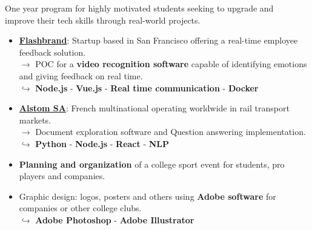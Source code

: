 \documentclass[9pt,a4paper,ragged2e]{altacv}
\begin{document}
One year program for highly motivated students seeking to upgrade and \\improve their tech skills through real-world projects.
\smallskip
\begin{itemize}
	\item \href{https://flashbrand.me/}{\textbf{Flashbrand}}: Startup based in San Francisco offering a real-time employee feedback solution. \\$\rightarrow$ POC for a \textbf{video recognition software} capable of identifying emotions and giving feedback on real time. \\
    $\hookrightarrow$ \textbf{Node.js} - \textbf{Vue.js} - \textbf{Real time communication} - \textbf{Docker}
  \item \href{https://www.alstom.com/}{\textbf{Alstom SA}}: French multinational operating worldwide in rail transport \\markets.\\
  $\rightarrow$ Document exploration software and Question answering implementation.\\
  $\hookrightarrow$ \textbf{Python} - \textbf{Node.js} - \textbf{React} - \textbf{NLP}
\end{itemize}
\divider
{}
\begin{itemize}
	\item \textbf{Planning and organization} of a college sport event for students, pro players and companies.
\end{itemize}
\divider
{}
\begin{itemize}
	\item Graphic design: logos, posters and others using \textbf{Adobe software} for \\companies or other college clubs.\\
  $\hookrightarrow$ \textbf{Adobe Photoshop} - \textbf{Adobe Illustrator}
\end{itemize}

\end{document}
